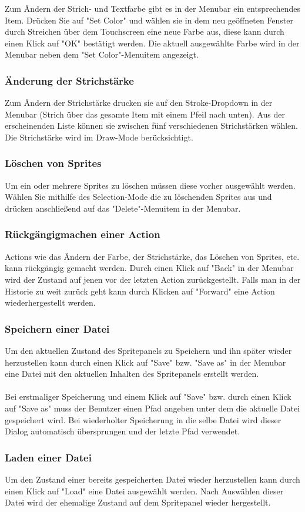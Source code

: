 Zum Ändern der Strich- und Textfarbe gibt es in der Menubar ein entsprechendes Item. Drücken Sie auf "Set Color" und wählen sie in dem neu geöffneten Fenster durch Streichen über dem Touchscreen eine neue Farbe aus, diese kann durch einen  Klick auf "OK" bestätigt werden. Die aktuell ausgewählte Farbe wird in der Menubar neben dem "Set Color"-Menuitem angezeigt.

\subsubsection{Änderung der Strichstärke}

Zum Ändern der Strichstärke drucken sie auf den Stroke-Dropdown in der Menubar (Strich über das gesamte Item mit einem Pfeil nach unten). Aus der erscheinenden Liste können sie zwischen fünf verschiedenen Strichstärken wählen. Die Strichstärke wird im Draw-Mode berücksichtigt.

\subsubsection{Löschen von Sprites}

Um ein oder mehrere Sprites zu löschen müssen diese vorher ausgewählt werden. Wählen Sie mithilfe des Selection-Mode die zu löschenden Sprites aus und drücken anschließend auf das "Delete"-Menuitem in der Menubar.

\subsubsection{Rückgängigmachen einer Action}

Actions wie das Ändern der Farbe, der Strichstärke, das Löschen von Sprites, etc. kann rückgängig gemacht werden. Durch einen Klick auf "Back" in der Menubar wird der Zustand auf jenen vor der letzten Action zurückgestellt. Falls man in der Historie zu weit zurück geht kann durch Klicken auf "Forward" eine Action wiederhergestellt werden.

\subsubsection{Speichern einer Datei}

Um den aktuellen Zustand des Spritepanels zu Speichern und ihn später wieder herzustellen kann durch einen Klick auf "Save" bzw. "Save as" in der Menubar eine Datei mit den aktuellen Inhalten des Spritepanels erstellt werden.\\
\\
Bei erstmaliger Speicherung und einem Klick auf "Save" bzw. durch einen Klick auf "Save as" muss der Benutzer einen Pfad angeben unter dem die aktuelle Datei gespeichert wird. Bei wiederholter Speicherung in die selbe Datei wird dieser Dialog automatisch übersprungen und der letzte Pfad verwendet.

\subsubsection{Laden einer Datei}

Um den Zustand einer bereits gespeicherten Datei wieder herzustellen kann durch einen Klick auf "Load" eine Datei ausgewählt werden. Nach Auswählen dieser Datei wird der ehemalige Zustand auf dem Spritepanel wieder hergestellt.